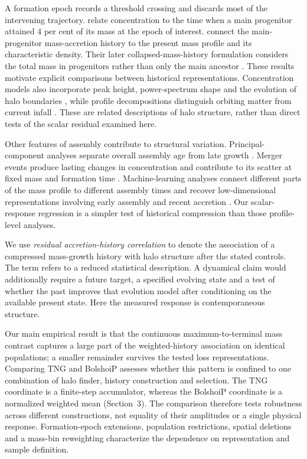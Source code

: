 \documentclass[11pt,a4paper]{article}
\begin{document}
A formation epoch records a threshold crossing and discards most of the intervening trajectory. \citet{Zhao2009} relate concentration to the time when a main progenitor attained 4 per cent of its mass at the epoch of interest. \citet{Ludlow2013} connect the main-progenitor mass-accretion history to the present mass profile and its characteristic density. Their later collapsed-mass-history formulation considers the total mass in progenitors rather than only the main ancestor \citep{Ludlow2016}. These results motivate explicit comparisons between historical representations. Concentration models also incorporate peak height, power-spectrum shape and the evolution of halo boundaries \citep{DiemerJoyce2019}, while profile decompositions distinguish orbiting matter from current infall \citep{Diemer2023}. These are related descriptions of halo structure, rather than direct tests of the scalar residual examined here.

Other features of assembly contribute to structural variation. Principal-component analyses separate overall assembly age from late growth \citep{Wong2012}. Merger events produce lasting changes in concentration and contribute to its scatter at fixed mass and formation time \citep{Wang2020}. Machine-learning analyses connect different parts of the mass profile to different assembly times and recover low-dimensional representations involving early assembly and recent accretion \citep{LS2022,LS2024}. Our scalar-response regression is a simpler test of historical compression than those profile-level analyses.

We use \emph{residual accretion-history correlation} to denote the association of a compressed mass-growth history with halo structure after the stated controls. The term refers to a reduced statistical description. A dynamical claim would additionally require a future target, a specified evolving state and a test of whether the past improves that evolution model after conditioning on the available present state. Here the measured response is contemporaneous structure.

Our main empirical result is that the continuous maximum-to-terminal mass contrast captures a large part of the weighted-history association on identical populations; a smaller remainder survives the tested loss representations. Comparing TNG and BolshoiP assesses whether this pattern is confined to one combination of halo finder, history construction and selection. The TNG coordinate is a finite-step accumulator, whereas the BolshoiP coordinate is a normalized weighted mean (Section~3). The comparison therefore tests robustness across different constructions, not equality of their amplitudes or a single physical response. Formation-epoch extensions, population restrictions, spatial deletions and a mass-bin reweighting characterize the dependence on representation and sample definition.
\end{document}

